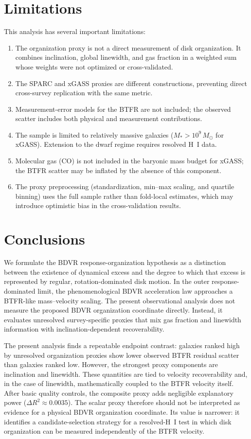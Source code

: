 \documentclass[11pt]{article}
\begin{document}
\section{Limitations}

This analysis has several important limitations:

\begin{enumerate}
\item The organization proxy is not a direct measurement of disk organization. It combines inclination, global linewidth, and gas fraction in a weighted sum whose weights were not optimized or cross-validated.
\item The SPARC and xGASS proxies are different constructions, preventing direct cross-survey replication with the same metric.
\item Measurement-error models for the BTFR are not included; the observed scatter includes both physical and measurement contributions.
\item The sample is limited to relatively massive galaxies ($M_* > 10^9\,M_\odot$ for xGASS). Extension to the dwarf regime requires resolved H~I data.
\item Molecular gas (CO) is not included in the baryonic mass budget for xGASS; the BTFR scatter may be inflated by the absence of this component.
\item The proxy preprocessing (standardization, min--max scaling, and quartile binning) uses the full sample rather than fold-local estimates, which may introduce optimistic bias in the cross-validation results.
\end{enumerate}

\section{Conclusions}

We formulate the BDVR response-organization hypothesis as a distinction between the existence of dynamical excess and the degree to which that excess is represented by regular, rotation-dominated disk motion. In the outer response-dominated limit, the phenomenological BDVR acceleration law approaches a BTFR-like mass--velocity scaling. The present observational analysis does not measure the proposed BDVR organization coordinate directly. Instead, it evaluates unresolved survey-specific proxies that mix gas fraction and linewidth information with inclination-dependent recoverability.

The present analysis finds a repeatable endpoint contrast: galaxies ranked high by unresolved organization proxies show lower observed BTFR residual scatter than galaxies ranked low. However, the strongest proxy components are inclination and linewidth. These quantities are tied to velocity recoverability and, in the case of linewidth, mathematically coupled to the BTFR velocity itself. After basic quality controls, the composite proxy adds negligible explanatory power ($\Delta R^2 \approx 0.0035$). The scalar proxy therefore should not be interpreted as evidence for a physical BDVR organization coordinate. Its value is narrower: it identifies a candidate-selection strategy for a resolved-H~I test in which disk organization can be measured independently of the BTFR velocity.
\end{document}
